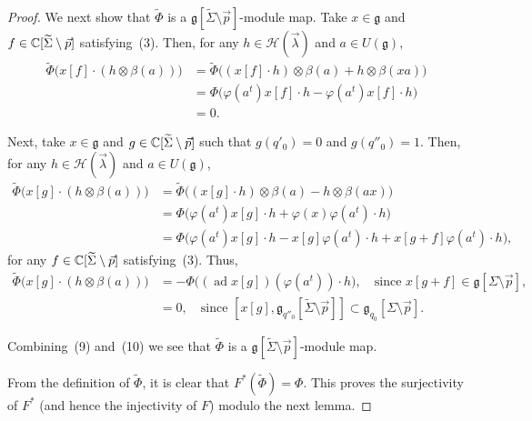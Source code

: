 \documentclass[12pt]{article}
\begin{document}
\begin{proof}
We next show that $\widetilde\Phi$ is a $\mathfrak g[\widetilde\Sigma\setminus\vec p]$-module map. Take $x\in\mathfrak g$ and $f\in\mathbb{C}[\widetilde\Sigma\setminus\vec p]$ satisfying~(3). Then, for any $h\in\mathcal H(\vec\lambda)$ and $a\in U(\mathfrak g)$,
\begin{align}
\widetilde\Phi\big(x[f]\cdot(h\otimes\beta(a))\big)
&=\widetilde\Phi\big((x[f]\cdot h)\otimes\beta(a)+h\otimes\beta(xa)\big)\\
&=\Phi\big(\varphi(a^t)x[f]\cdot h-\varphi(a^t)x[f]\cdot h\big)\\
&=0.
\tag{9}
\end{align}



Next, take $x\in\mathfrak g$ and $g\in\mathbb{C}[\widetilde\Sigma\setminus\vec p]$ such that $g(q'_0)=0$ and $g(q''_0)=1$. Then, for any $h\in\mathcal H(\vec\lambda)$ and $a\in U(\mathfrak g)$,
\begin{align}
\widetilde\Phi\big(x[g]\cdot(h\otimes\beta(a))\big)
&=\widetilde\Phi\big((x[g]\cdot h)\otimes\beta(a)-h\otimes\beta(ax)\big)\\
&=\Phi\big(\varphi(a^t)x[g]\cdot h+\varphi(x)\varphi(a^t)\cdot h\big)\\
&=\Phi\big(\varphi(a^t)x[g]\cdot h-x[g]\varphi(a^t)\cdot h+x[g+f]\varphi(a^t)\cdot h\big),
\end{align}
for any $f\in\mathbb{C}[\widetilde\Sigma\setminus\vec p]$ satisfying~(3). Thus,
\begin{align}
\widetilde\Phi\big(x[g]\cdot(h\otimes\beta(a))\big)
&=-\Phi\big((\operatorname{ad}x[g])(\varphi(a^t))\cdot h\big),\quad\text{since }x[g+f]\in\mathfrak g[\Sigma\setminus\vec p],\\
&=0,\quad\text{since }[x[g],\mathfrak g_{q''_0}[\widetilde\Sigma\setminus\vec p]]\subset\mathfrak g_{q_0}[\Sigma\setminus\vec p].
\tag{10}
\end{align}

Combining~(9) and~(10) we see that $\widetilde\Phi$ is a $\mathfrak g[\widetilde\Sigma\setminus\vec p]$-module map.

From the definition of $\widetilde\Phi$, it is clear that $F^*(\widetilde\Phi)=\Phi$. This proves the surjectivity of $F^*$ (and hence the injectivity of $F$) modulo the next lemma. 
\end{proof}
\end{document}
